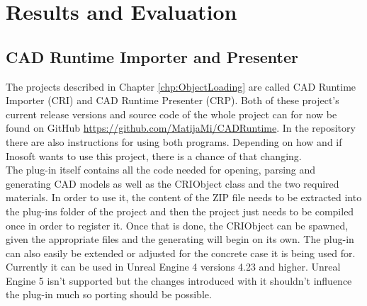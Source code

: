 \chapter{Results and Evaluation}\label{chp:Results}

\section{CAD Runtime Importer and Presenter}

The projects described in Chapter \ref{chp:ObjectLoading} are called CAD Runtime Importer (\acs{CRI}) and CAD Runtime Presenter (\acs{CRP}). Both of these project's current release versions and source code of the whole project can for now be found on GitHub \url{https://github.com/MatijaMi/CADRuntime}. In the repository there are also instructions for using both programs. Depending on how and if Inosoft wants to use this project, there is a chance of that changing.\\
The plug-in itself contains all the code needed for opening, parsing and generating CAD models as well as the CRIObject class and the two required materials. In order to use it, the content of the ZIP file needs to be extracted into the plug-ins folder of the project and then the project just needs to be compiled once in order to register it. Once that is done, the CRIObject can be spawned, given the appropriate files and the generating will begin on its own. The plug-in can also easily be extended or adjusted for the concrete case it is being used for. Currently it can be used in Unreal Engine 4 versions 4.23 and higher. Unreal Engine 5 isn't supported but the changes introduced with it shouldn't influence the plug-in much so porting should be possible.\\
